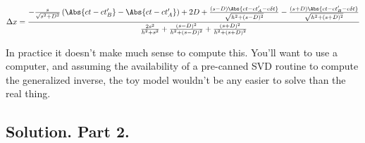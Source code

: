 \begin{equation}\label{eqn:relativisticElectrodynamicsA1:400}
\Delta x =
\frac{
   -\frac{s}{\sqrt{s^2 + D^2}} \left( \Abs{ ct - c t_B' } - \Abs{ c t - c t_A'} \right) +2 D
   + \frac{(s - D)\Abs{c t - c t_A' - c \delta t} }{ \sqrt{ h^2 + (s - D)^2 } } 
   - \frac{(s + D)\Abs{c t - c t_B' - c \delta t} }{ \sqrt{ h^2 + (s + D)^2 } } }
{
   \frac{2 s^2}{h^2 + s^2}
   +\frac{(s - D)^2}{h^2 + (s -D)^2}
   +\frac{(s + D)^2}{h^2 + (s +D)^2}
}
\end{equation}

In practice it doesn't make much sense to compute this.  You'll want to use a computer, and assuming the availability of a pre-canned SVD routine to compute the generalized inverse, the toy model wouldn't be any easier to solve than the real thing.

\subsection{Solution. Part 2.}

\EndArticle
